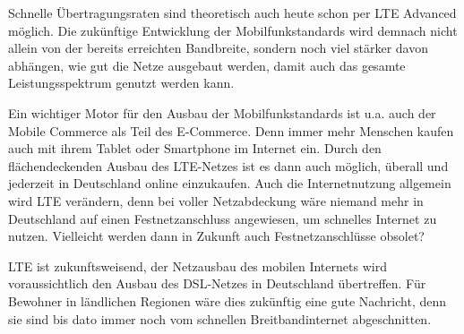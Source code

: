 \begin{multicols}{3}
Schnelle Übertragungsraten sind theoretisch auch heute schon per LTE Advanced möglich. Die zukünftige Entwicklung der Mobilfunkstandards wird demnach nicht allein von der bereits erreichten Bandbreite, sondern noch viel stärker davon abhängen, wie gut die Netze ausgebaut werden, damit auch das gesamte Leistungsspektrum genutzt werden kann.

Ein wichtiger Motor für den Ausbau der Mobilfunkstandards ist u.a. auch der Mobile Commerce als Teil des E-Commerce. Denn immer mehr Menschen kaufen auch mit ihrem Tablet oder Smartphone im Internet ein. Durch den flächendeckenden Ausbau des LTE-Netzes ist es dann auch möglich, überall und jederzeit in Deutschland online einzukaufen. Auch die Internetnutzung allgemein wird LTE verändern, denn bei voller Netzabdeckung wäre niemand mehr in Deutschland auf einen Festnetzanschluss angewiesen, um schnelles Internet zu nutzen. Vielleicht werden dann in Zukunft auch Festnetzanschlüsse obsolet?

LTE ist zukunftsweisend, der Netzausbau des mobilen Internets wird voraussichtlich den Ausbau des DSL-Netzes in Deutschland übertreffen. Für Bewohner in ländlichen Regionen wäre dies zukünftig eine gute Nachricht, denn sie sind bis dato immer noch vom schnellen Breitbandinternet abgeschnitten.


\printbibliography[segment=11,heading=subbibliography]
\end{multicols}
\newpage